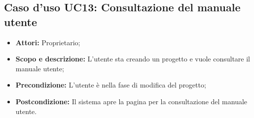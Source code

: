 \subsection{Caso d'uso UC13: Consultazione del manuale utente}
\begin{itemize}
	\item \textbf{Attori:} Proprietario;
	\item \textbf{Scopo e descrizione:} L'utente sta creando un progetto e vuole consultare il manuale utente;
	\item \textbf{Precondizione:} L'utente è nella fase di modifica del progetto;
	\item \textbf{Postcondizione:} Il sistema apre la pagina per la consultazione del manuale utente.
\end{itemize}